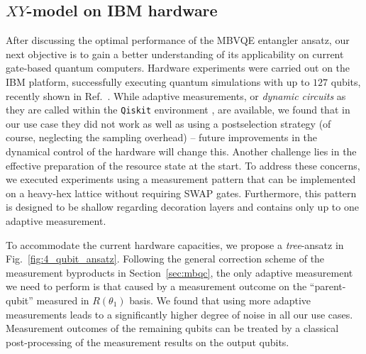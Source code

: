 \documentclass[../main.tex]{subfiles}
\begin{document}
\subsection{$XY$-model on IBM hardware}
After discussing the optimal performance of the MBVQE entangler ansatz, our next objective is to gain a better understanding of its applicability on current gate-based quantum computers. 
Hardware experiments were carried out on the IBM platform, successfully executing quantum simulations with up to $127$ qubits, recently shown in Ref.~\cite{kim2023evidence}. While adaptive measurements, or \textit{dynamic circuits} as they are called within the \texttt{Qiskit} environment \cite{Qiskit}, are available, we found that in our use case they did not work as well as using a postselection strategy (of course, neglecting the sampling overhead) -- future improvements in the dynamical control of the hardware will change this.
Another challenge lies in the effective preparation of the resource state at the start. To address these concerns, we executed experiments using a measurement pattern that can be implemented on a heavy-hex lattice without requiring SWAP gates. Furthermore, this pattern is designed to be shallow regarding decoration layers and contains only up to one adaptive measurement.


To accommodate the current hardware capacities, we propose a \textit{tree}-ansatz in Fig.~\ref{fig:4_qubit_ansatz}. Following the general correction scheme of the measurement byproducts in Section~\ref{sec:mbqc}, the only adaptive measurement we need to perform is that caused by a measurement outcome on the ``parent-qubit'' measured in $R(\theta_1)$ basis. We found that using more adaptive measurements leads to a significantly higher degree of noise in all our use cases. Measurement outcomes of the remaining qubits can be treated by a classical post-processing of the measurement results on the output qubits.
\end{document}
